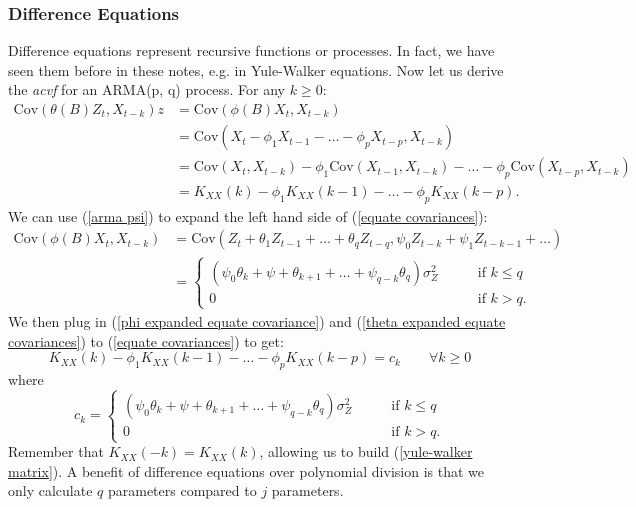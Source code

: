 \documentclass{article}
\begin{document}
\subsubsection{Difference Equations}
Difference equations represent recursive functions or processes. In fact, we have seen them before in these notes, e.g. in Yule-Walker equations. Now let us derive the \emph{acvf} for an ARMA(p, q) process. For any $k\geq0$:
\begin{align}
    \text{Cov}(\theta(B)Z_t, X_{t-k})z&=\text{Cov}(\phi(B)X_t,X_{t-k}) \label{equate covariances}\\
    &= \text{Cov}(X_t-\phi_1X_{t-1}-\ldots-\phi_pX_{t-p}, X_{t-k})\nonumber\\
    &=\text{Cov}(X_t,X_{t-k})-\phi_1\text{Cov}(X_{t-1}, X_{t-k})-\ldots-\phi_p \text{Cov}(X_{t-p}, X_{t-k})\nonumber\\
    &= K_{XX}(k) - \phi_1K_{XX}(k-1)-\ldots-\phi_p K_{XX}(k-p). \label{phi expanded equate covariance}
\end{align}
We can use (\ref{arma psi}) to expand the left hand side of (\ref{equate covariances}):
\begin{align}\label{theta expanded equate covariances}
    \text{Cov}(\phi(B)X_t,X_{t-k}) &= \text{Cov}(Z_t+\theta_1Z_{t-1} +\ldots+\theta_qZ_{t-q}, \psi_0Z_{t-k} + \psi_1Z_{t-k-1}+\ldots)\nonumber\\
    &= \begin{cases}
        (\psi_0\theta_k+\psi+\theta_{k+1} + \ldots+\psi_{q-k}\theta_q)\sigma_Z^2 \qquad &\text{if } k \leq q\\
        0 \qquad &\text{if } k > q.
    \end{cases}
\end{align}
We then plug in (\ref{phi expanded equate covariance}) and (\ref{theta expanded equate covariances}) to (\ref{equate covariances}) to get:
\begin{equation}
    K_{XX}(k)-\phi_1K_{XX}(k-1)-\ldots-\phi_pK_{XX}(k-p)=c_k \qquad \forall k \geq 0
\end{equation}
where
\begin{equation}
    c_k = \begin{cases}
        (\psi_0\theta_k+\psi+\theta_{k+1} + \ldots+\psi_{q-k}\theta_q)\sigma_Z^2 \qquad &\text{if } k \leq q\\
        0 \qquad &\text{if } k > q.
    \end{cases}
\end{equation}
Remember that $K_{XX}(-k)=K_{XX}(k)$, allowing us to build (\ref{yule-walker matrix}). A benefit of difference equations over polynomial division is that we only calculate $q$ parameters compared to $j$ parameters.
\end{document}

